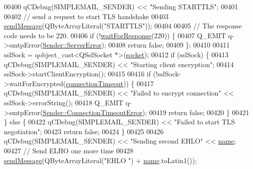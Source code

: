 \begin{DoxyCode}
00400         qCDebug(SIMPLEMAIL\_SENDER) << \textcolor{stringliteral}{"Sending STARTTLS"};
00401 
00402         \textcolor{comment}{// send a request to start TLS handshake}
00403         \hyperlink{class_simple_mail_1_1_sender_private_a01805bb24291bf6cad3a656a16d0bb25}{sendMessage}(QByteArrayLiteral(\textcolor{stringliteral}{"STARTTLS"}));
00404 
00405         \textcolor{comment}{// The response code needs to be 220.}
00406         \textcolor{keywordflow}{if} (!\hyperlink{class_simple_mail_1_1_sender_private_af8ba23dc3e1201d303ad1d923235c71c}{waitForResponse}(220)) \{
00407             Q\_EMIT q->smtpError(\hyperlink{class_simple_mail_1_1_sender_a276560e9e955ab6be451338c3776bf49aa5d58da2b004bb7275a92029fe432089}{Sender::ServerError});
00408             \textcolor{keywordflow}{return} \textcolor{keyword}{false};
00409         \};
00410 
00411         sslSock = qobject\_cast<QSslSocket *>(\hyperlink{class_simple_mail_1_1_sender_private_a223cab47555a39f45f30569328fa20bc}{socket});
00412         \textcolor{keywordflow}{if} (sslSock) \{
00413             qCDebug(SIMPLEMAIL\_SENDER) << \textcolor{stringliteral}{"Starting client encryption"};
00414             sslSock->startClientEncryption();
00415 
00416             \textcolor{keywordflow}{if} (!sslSock->waitForEncrypted(\hyperlink{class_simple_mail_1_1_sender_private_a9328b6f8c9df4ce6e8517ec713f42421}{connectionTimeout})) \{
00417                 qCDebug(SIMPLEMAIL\_SENDER) << \textcolor{stringliteral}{"Failed to encrypt connection"} << sslSock->errorString();
00418                 Q\_EMIT q->smtpError(\hyperlink{class_simple_mail_1_1_sender_a276560e9e955ab6be451338c3776bf49a103e98eb7c1b1d901137406cba3af5a3}{Sender::ConnectionTimeoutError});
00419                 \textcolor{keywordflow}{return} \textcolor{keyword}{false};
00420             \}
00421         \} \textcolor{keywordflow}{else} \{
00422             qCDebug(SIMPLEMAIL\_SENDER) << \textcolor{stringliteral}{"Failed to start TLS negotiation"};
00423             \textcolor{keywordflow}{return} \textcolor{keyword}{false};
00424         \}
00425 
00426         qCDebug(SIMPLEMAIL\_SENDER) << \textcolor{stringliteral}{"Sending second EHLO"} << \hyperlink{class_simple_mail_1_1_sender_private_a9daecd69dd0c84595a9c3288f98094b4}{name};
00427         \textcolor{comment}{// Send ELHO one more time}
00428         \hyperlink{class_simple_mail_1_1_sender_private_a01805bb24291bf6cad3a656a16d0bb25}{sendMessage}(QByteArrayLiteral(\textcolor{stringliteral}{"EHLO "}) + \hyperlink{class_simple_mail_1_1_sender_private_a9daecd69dd0c84595a9c3288f98094b4}{name}.toLatin1());

\end{DoxyCode}
